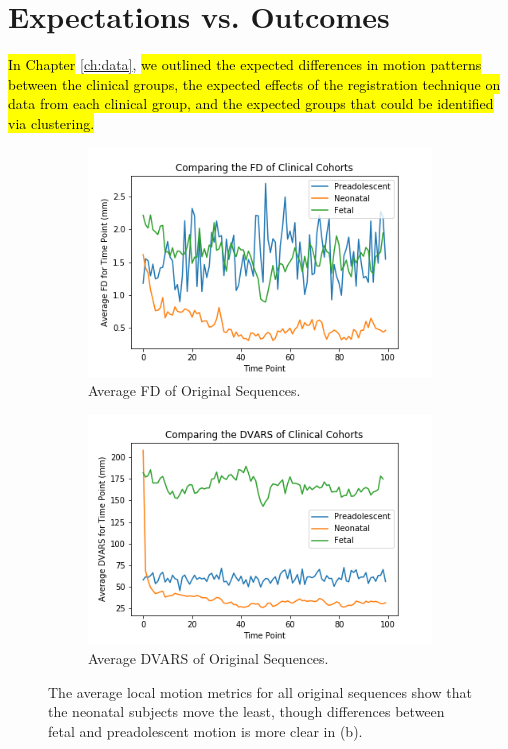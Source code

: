 \section{Expectations vs. Outcomes}

\hl{In Chapter} \ref{ch:data}, \hl{we outlined the expected differences in motion patterns between the clinical groups, the expected effects of the registration technique on data from each clinical group, and the expected groups that could be identified via clustering. }

\begin{figure}[]
	\centering
	\begin{subfigure}{0.4\textwidth}
		\centering
		\includegraphics[width=1.0\textwidth]{7/figures/orig-avg-fd.png}
		\caption{Average FD of Original Sequences.}
	\end{subfigure}
	\hspace{0.05\textwidth}
	\begin{subfigure}{0.4\textwidth}
		\centering
		\includegraphics[width=1.0\textwidth]{7/figures/orig-avg-dvars.png}
		\caption{Average DVARS of Original Sequences.}
	\end{subfigure}
	
\caption{The average local motion metrics for all original sequences show that the neonatal subjects move the least, though differences between fetal and preadolescent motion is more clear in (b).}
\label{fig:orig-local-motion}
\end{figure}

